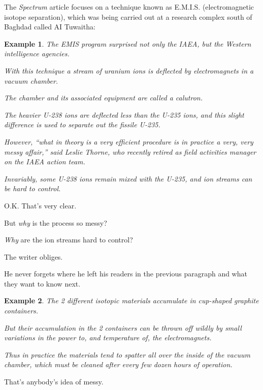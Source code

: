 \documentclass{book}
\numberwithin{equation}{section}
\newtheorem{example}{Example}[chapter]
\begin{document}
The \textit{Spectrum} article focuses on a technique known as E.M.I.S. (electromagnetic isotope separation), which was being carried out at a research complex south of Baghdad called AI Tuwaitha:
\begin{example}
    The EMIS program surprised not only the IAEA, but the Western intelligence agencies.
    
    With this technique a stream of uranium ions is deflected by electromagnets in a vacuum chamber.
    
    The chamber and its associated equipment are called a calutron.
    
    The heavier U-238 ions are deflected less than the U-235 ions, and this slight difference is used to separate out the fissile U-235.
    
    However, ``what in theory is a very efficient procedure is in practice a very, very messy affair,'' said Leslie Thorne, who recently retired as field activities manager on the IAEA action team.
    
    Invariably, some U-238 ions remain mixed with the U-235, and ion streams can be hard to control.
\end{example}
O.K. That's very clear.

But \textit{why} is the process so messy?

\textit{Why} are the ion streams hard to control?

The writer obliges.

He never forgets where he left his readers in the previous paragraph and what they want to know next.
\begin{example}
    The 2 different isotopic materials accumulate in cup-shaped graphite containers.
    
    But their accumulation in the 2 containers can be thrown off wildly by small variations in the power to, and temperature of, the electromagnets.
    
    Thus in practice the materials tend to spatter all over the inside of the vacuum chamber, which must be cleaned after every few dozen hours of operation.
\end{example}
That's anybody's idea of messy.
\end{document}

